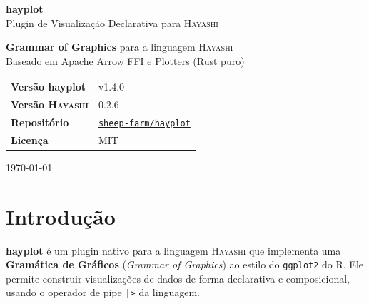 \documentclass[12pt, a4paper, oneside]{book}
\newcommand{\code}[1]{\texttt{#1}}
\newcommand{\hayashi}{\textsc{Hayashi}}
\newcommand{\hayplot}{\textbf{hayplot}}
\newcommand{\hayversiontag}{v1.4.0}
\newcommand{\hayashiversiontag}{0.2.6}
\begin{document}
\begin{titlepage}
  \centering
  \vspace*{2.5cm}

  {\Huge\bfseries\color{hayblue} hayplot}\\[0.4em]
  {\large\color{haygray} Plugin de Visualização Declarativa para \hayashi}

  \vspace{1.5cm}

  \begin{tcolorbox}[
    enhanced, sharp corners,
    colback=hayblue, colframe=hayblue,
    width=0.85\textwidth,
    halign=center,
    fontupper=\color{white}\large
  ]
    \textbf{Grammar of Graphics} para a linguagem \hayashi \\[0.2em]
    \small Baseado em Apache Arrow FFI e Plotters (Rust puro)
  \end{tcolorbox}

  \vspace{2cm}

  \begin{tabularx}{0.65\textwidth}{@{}lX@{}}
    \toprule
    \textbf{Versão hayplot}     & \hayversiontag \\
    \textbf{Versão \hayashi{}}  & \hayashiversiontag \\
    \textbf{Repositório}        & \href{https://github.com/sheep-farm/hayplot}{\code{sheep-farm/hayplot}} \\
    \textbf{Licença}            & MIT \\
    \bottomrule
  \end{tabularx}

  \vfill
  {\small \today}
\end{titlepage}

\tableofcontents
\clearpage

\chapter{Introdução}

\hayplot{} é um plugin nativo para a linguagem \hayashi{} que implementa
uma \textbf{Gramática de Gráficos} (\textit{Grammar of Graphics}) ao estilo do
\code{ggplot2} do R. Ele permite construir visualizações de dados de forma
declarativa e composicional, usando o operador de pipe \code{|>} da linguagem.
\end{document}
